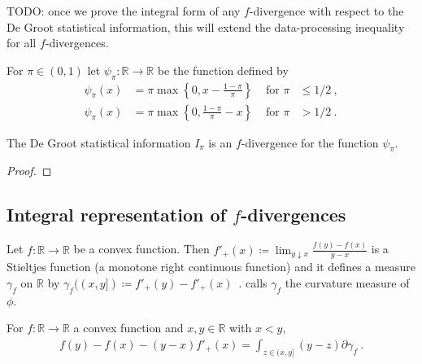 TODO: once we prove the integral form of any $f$-divergence with respect to the De Groot statistical information, this will extend the data-processing inequality for all $f$-divergences. 

\begin{definition}
  \label{def:deGrootFun}
  \uses{}
  For $\pi \in (0,1)$ let $\psi_\pi : \mathbb{R} \to \mathbb{R}$ be the function defined by
  \begin{align*}
  \psi_\pi(x) &= \pi \max\left\{0, x - \frac{1 - \pi}{\pi}\right\} & \text{ for } \pi &\le 1/2 \: ,
  \\
  \psi_\pi(x) &= \pi \max\left\{0, \frac{1 - \pi}{\pi} - x\right\} & \text{ for } \pi &> 1/2 \: .
  \end{align*}
\end{definition}

\begin{lemma}
  \label{lem:deGrootInfo_eq_fDiv}
  The De Groot statistical information $I_\pi$ is an $f$-divergence for the function $\psi_\pi$.
\end{lemma}

\begin{proof}%
\uses{}

\end{proof}

\subsection{Integral representation of $f$-divergences}

\begin{definition}
  \label{def:curvatureMeasure}
  \uses{}
  Let $f: \mathbb{R} \to \mathbb{R}$ be a convex function. Then $f'_+(x) \coloneqq \lim_{y \downarrow x}\frac{f(y) - f(x)}{y - x}$ is a Stieltjes function (a monotone right continuous function) and it defines a measure $\gamma_f$ on $\mathbb{R}$ by $\gamma_f((x,y]) \coloneqq f'_+(y) - f'_+(x)$~. \cite{liese2012phi} calls $\gamma_f$ the curvature measure of $\phi$.
\end{definition}

\begin{lemma}
  \label{lem:convex_taylor_gt}
  For $f: \mathbb{R} \to \mathbb{R}$ a convex function and $x,y \in \mathbb{R}$ with $x < y$,
  \begin{align*}
  f(y) - f(x) - (y - x)f'_+(x) = \int_{z \in (x,y]} (y - z) \partial \gamma_f \: .
  \end{align*}
\end{lemma}


